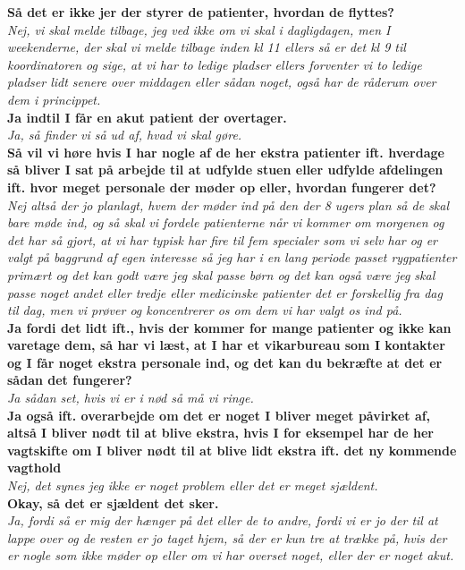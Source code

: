 \noindent
\textbf{Så det er ikke jer der styrer de patienter, hvordan de flyttes?}\\
\noindent
\textit{Nej, vi skal melde tilbage, jeg ved ikke om vi skal i dagligdagen, men I weekenderne, der skal vi melde tilbage inden kl 11 ellers så er det kl 9 til koordinatoren og sige, at vi har to ledige pladser ellers forventer vi to ledige pladser lidt senere over middagen eller sådan noget, også har de råderum over dem i princippet.}\\
\noindent
\textbf{Ja indtil I får en akut patient der overtager.}\\
\noindent
\textit{Ja, så finder vi så ud af, hvad vi skal gøre.}\\
\noindent
\textbf{Så vil vi høre hvis I har nogle af de her ekstra patienter ift. hverdage så bliver I sat på arbejde til at udfylde stuen eller udfylde afdelingen ift. hvor meget personale der møder op eller, hvordan fungerer det?}\\
\noindent
\textit{Nej altså der jo planlagt, hvem der møder ind på den der 8 ugers plan så de skal bare møde ind, og så skal vi fordele patienterne når vi kommer om morgenen og det har så gjort, at vi har typisk har fire til fem specialer som vi selv har og er valgt på baggrund af egen interesse så jeg har i en lang periode passet rygpatienter primært og det kan godt være jeg skal passe børn og det kan også være jeg skal passe noget andet eller tredje eller medicinske patienter det er forskellig fra dag til dag, men vi prøver og koncentrerer os om dem vi har valgt os ind på.}\\
\noindent
\textbf{Ja fordi det lidt ift., hvis der kommer for mange patienter og ikke kan varetage dem, så har vi læst, at I har et vikarbureau som I kontakter og I får noget ekstra personale ind, og det kan du bekræfte at det er sådan det fungerer?} \\
\noindent
\textit{Ja sådan set, hvis vi er i nød så må vi ringe.}\\
\noindent
\textbf{Ja også ift. overarbejde om det er noget I bliver meget påvirket af, altså I bliver nødt til at blive ekstra, hvis I for eksempel har de her vagtskifte om I bliver nødt til at blive lidt ekstra ift. det ny kommende vagthold}\\
\noindent
\textit{Nej, det synes jeg ikke er noget problem eller det er meget sjældent.}\\
\noindent
\textbf{Okay, så det er sjældent det sker.}\\
\noindent
\textit{ Ja, fordi så er mig der hænger på det eller de to andre, fordi vi er jo der til at lappe over og de resten er jo taget hjem, så der er kun tre at trække på, hvis der er nogle som ikke møder op eller om vi har overset noget, eller der er noget akut. }\\
